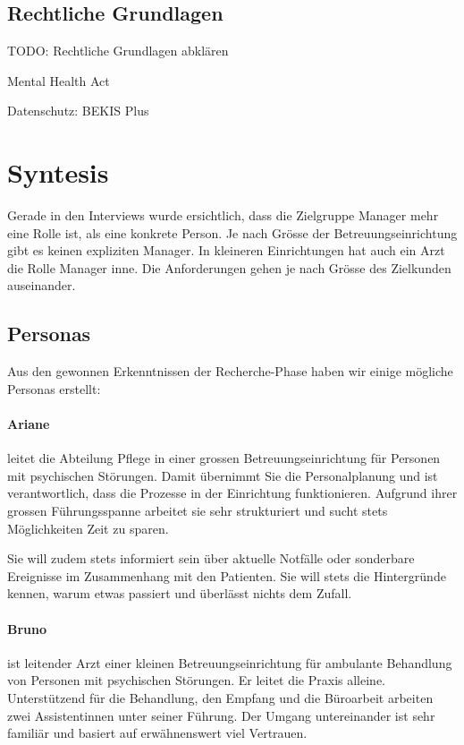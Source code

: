 \documentclass[a4paper]{scrreprt}
\begin{document}
\subsection{Rechtliche Grundlagen}
TODO: Rechtliche Grundlagen abklären

Mental Health Act

Datenschutz: BEKIS Plus





\section{Syntesis}
Gerade in den Interviews wurde ersichtlich, dass die Zielgruppe Manager mehr eine Rolle ist, als eine konkrete Person. Je nach Grösse der Betreuungseinrichtung gibt es keinen expliziten Manager. In kleineren Einrichtungen hat auch ein Arzt die Rolle Manager inne.
Die Anforderungen gehen je nach Grösse des Zielkunden auseinander.

\subsection{Personas}
Aus den gewonnen Erkenntnissen der Recherche-Phase haben wir einige mögliche Personas erstellt:

\paragraph{Ariane} leitet die Abteilung Pflege in einer grossen Betreuungseinrichtung für Personen mit psychischen Störungen. Damit übernimmt Sie die Personalplanung und ist verantwortlich, dass die Prozesse in der Einrichtung funktionieren. Aufgrund ihrer grossen Führungsspanne arbeitet sie sehr strukturiert und sucht stets Möglichkeiten Zeit zu sparen.

Sie will zudem stets informiert sein über aktuelle Notfälle oder sonderbare Ereignisse im Zusammenhang mit den Patienten. Sie will stets die Hintergründe kennen, warum etwas passiert und überlässt nichts dem Zufall.


\paragraph{Bruno} ist leitender Arzt einer kleinen Betreuungseinrichtung für ambulante Behandlung von Personen mit psychischen Störungen. Er leitet die Praxis alleine. Unterstützend für die Behandlung, den Empfang und die Büroarbeit arbeiten zwei Assistentinnen unter seiner Führung. Der Umgang untereinander ist sehr familiär und basiert auf erwähnenswert viel Vertrauen.
\end{document}
